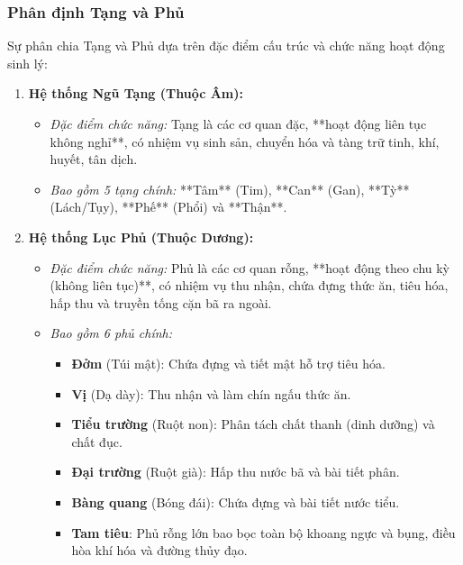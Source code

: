 \subsubsection{Phân định Tạng và Phủ}

Sự phân chia Tạng và Phủ dựa trên đặc điểm cấu trúc và chức năng hoạt động sinh lý:

\begin{enumerate}
    \item \textbf{Hệ thống Ngũ Tạng (Thuộc Âm):}
    \begin{itemize}
        \item \textit{Đặc điểm chức năng:} Tạng là các cơ quan đặc, **hoạt động liên tục không nghỉ**, có nhiệm vụ sinh sản, chuyển hóa và tàng trữ tinh, khí, huyết, tân dịch.
        \item \textit{Bao gồm 5 tạng chính:} **Tâm** (Tim), **Can** (Gan), **Tỳ** (Lách/Tụy), **Phế** (Phổi) và **Thận**.
    \end{itemize}

    \item \textbf{Hệ thống Lục Phủ (Thuộc Dương):}
    \begin{itemize}
        \item \textit{Đặc điểm chức năng:} Phủ là các cơ quan rỗng, **hoạt động theo chu kỳ (không liên tục)**, có nhiệm vụ thu nhận, chứa đựng thức ăn, tiêu hóa, hấp thu và truyền tống cặn bã ra ngoài.
        \item \textit{Bao gồm 6 phủ chính:}
        \begin{itemize}
            \item \textbf{Đởm} (Túi mật): Chứa đựng và tiết mật hỗ trợ tiêu hóa.
            \item \textbf{Vị} (Dạ dày): Thu nhận và làm chín ngấu thức ăn.
            \item \textbf{Tiểu trường} (Ruột non): Phân tách chất thanh (dinh dưỡng) và chất đục.
            \item \textbf{Đại trường} (Ruột già): Hấp thu nước bã và bài tiết phân.
            \item \textbf{Bàng quang} (Bóng đái): Chứa đựng và bài tiết nước tiểu.
            \item \textbf{Tam tiêu}: Phủ rỗng lớn bao bọc toàn bộ khoang ngực và bụng, điều hòa khí hóa và đường thủy đạo.
        \end{itemize}
    \end{itemize}
\end{enumerate}


